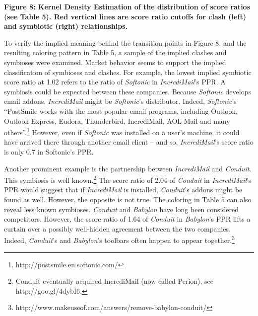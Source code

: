 \documentclass{article} %
\begin{document}
\noindent \textbf{Figure 8: Kernel Density Estimation of the distribution of score ratios (see Table 5). Red vertical lines are score ratio cutoffs for clash (left) and symbiotic (right) relationships. }



To verify the implied meaning behind the transition points in Figure 8, and the resulting coloring pattern in Table 5, a sample of the implied clashes and symbioses were examined. Market behavior seems to support the implied classification of symbioses and clashes. For example, the lowest implied symbiotic score ratio at 1.02 refers to the ratio of \textit{Softonic} in \textit{IncrediMail}'s PPR. A symbiosis could be expected between these companies. Because \textit{Softonic} develops email addons, \textit{IncrediMail} might be \textit{Softonic}'s distributor. Indeed, \textit{Softonic}'s ``PostSmile works with the most popular email programs, including Outlook, Outlook Express, Eudora, Thunderbird, IncrediMail, AOL Mail and many others''.\footnote{ http://postsmile.en.softonic.com/} However, even if \textit{Softonic }was installed on a user's machine, it could have arrived there through another email client -- and so, \textit{IncrediMail}'s score ratio is only 0.7 in Softonic's PPR. 

Another prominent example is the partnership between \textit{IncrediMail} and \textit{Conduit}. This symbiosis is well known.\footnote{ Conduit eventually acquired IncrediMail (now called Perion), see http://goo.gl/4dybI6.} The score ratio of 2.04 of \textit{Conduit} in \textit{IncrediMail}'s PPR would suggest that if \textit{IncrediMail} is installed, \textit{Conduit}'s addons might be found as well. However, the opposite is not true. The coloring in Table 5 can also reveal less known symbioses. \textit{Conduit} and \textit{Babylon} have long been considered competitors. However, the score ratio of 1.64 of \textit{Conduit} in \textit{Babylon}'s PPR lifts a curtain over a possibly well-hidden agreement between the two companies. Indeed, \textit{Conduit}'s and \textit{Babylon}'s toolbars often happen to appear together.\footnote{ http://www.makeuseof.com/answers/remove-babylon-conduit/}
\end{document}
